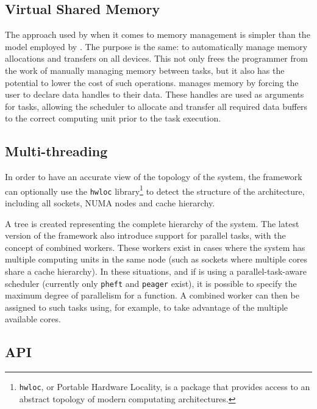 \documentclass[main.tex]{subfiles}
\begin{document}
\subsection{Virtual Shared Memory}

The approach used by \starpu when it comes to memory management is simpler than the model employed by \gama. The purpose is the same: to automatically manage memory allocations and transfers on all devices. This not only frees the programmer from the work of manually managing memory between tasks, but it also has the potential to lower the cost of such operations.
\starpu manages memory by forcing the user to declare data handles to their data. These handles are used as arguments for tasks, allowing the scheduler to allocate and transfer all required data buffers to the correct computing unit prior to the task execution.

\subsection{Multi-threading} \label{section:starpu_multithreading}

In order to have an accurate view of the topology of the system, the framework can optionally use the \texttt{hwloc} library\footnote{\texttt{hwloc}, or Portable Hardware Locality, is a package that provides access to an abstract topology of modern computating architectures.} \cite{broquedis2010hwloc} to detect the structure of the architecture, including all \cpu sockets, \acs{NUMA} nodes and cache hierarchy.

A tree is created representing the complete hierarchy of the system. The latest version of the framework also introduce support for parallel tasks, with the concept of combined workers. These workers exist in cases where the system has multiple computing units in the same node (such as \cpu sockets where multiple cores share a cache hierarchy). In these situations, and if \starpu is using a parallel-task-aware scheduler (currently only \texttt{pheft} and \texttt{peager} exist), it is possible to specify the maximum degree of parallelism for a function. A combined worker can then be assigned to such tasks using, for example, \openmp to take advantage of the multiple available cores.

\subsection{API} \label{section:starpu_api}
\end{document}
